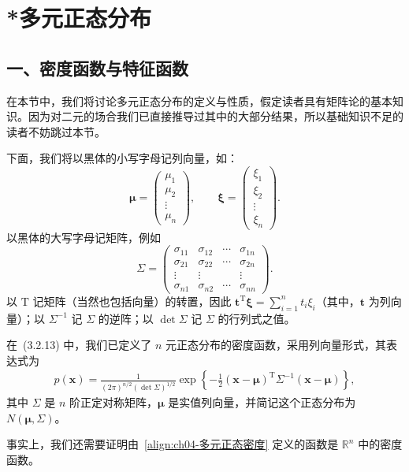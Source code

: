 \documentclass[../../main.tex]{subfiles}
\begin{document}
\section{*多元正态分布}\label{section:ch04-多元正态分布}

\subsection*{一、密度函数与特征函数}

在本节中，我们将讨论多元正态分布的定义与性质，假定读者具有矩阵论的基本知识。因为对二元的场合我们已直接推导过其中的大部分结果，所以基础知识不足的读者不妨跳过本节。

下面，我们将以黑体的小写字母记列向量，如：
\[
\boldsymbol{\mu}=\begin{pmatrix}\mu_1\\\mu_2\\\vdots\\\mu_n\end{pmatrix},\qquad
\boldsymbol{\xi}=\begin{pmatrix}\xi_1\\\xi_2\\\vdots\\\xi_n\end{pmatrix}.
\]
以黑体的大写字母记矩阵，例如
\[
\Sigma=\begin{pmatrix}
\sigma_{11}&\sigma_{12}&\cdots&\sigma_{1n}\\
\sigma_{21}&\sigma_{22}&\cdots&\sigma_{2n}\\
\vdots&\vdots&&\vdots\\
\sigma_{n1}&\sigma_{n2}&\cdots&\sigma_{nn}
\end{pmatrix}.
\]
以 $\mathrm{T}$ 记矩阵（当然也包括向量）的转置，因此 $\boldsymbol{t}^{\mathrm{T}}\boldsymbol{\xi}=\sum_{i=1}^n t_i\xi_i$（其中，$\boldsymbol{t}$ 为列向量）；以 $\Sigma^{-1}$ 记 $\Sigma$ 的逆阵；以 $\det\Sigma$ 记 $\Sigma$ 的行列式之值。

在~(3.2.13) 中，我们已定义了 $n$ 元正态分布的密度函数，采用列向量形式，其表达式为
\begin{align}
p(\boldsymbol{x})=\frac{1}{(2\pi)^{n/2}(\det\Sigma)^{1/2}}\exp\left\{-\frac12(\boldsymbol{x}-\boldsymbol{\mu})^{\mathrm{T}}\Sigma^{-1}(\boldsymbol{x}-\boldsymbol{\mu})\right\},\label{align:ch04-多元正态密度}
\end{align}
其中 $\Sigma$ 是 $n$ 阶正定对称矩阵，$\boldsymbol{\mu}$ 是实值列向量，并简记这个正态分布为 $N(\boldsymbol{\mu},\Sigma)$。

事实上，我们还需要证明由~\eqref{align:ch04-多元正态密度} 定义的函数是 $\mathbb{R}^n$ 中的密度函数。
\end{document}
